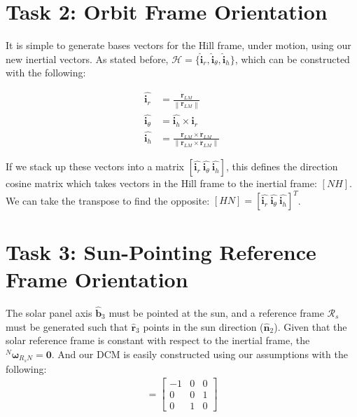 \documentclass[paper]{aiaaNew}
\newcommand{\norm}[1]{\left\lVert#1\right\rVert}
\begin{document}
\section*{Task 2: Orbit Frame Orientation}
It is simple to generate bases vectors for the Hill frame, under motion, using our new inertial vectors. As stated before, $\mathcal{H} = \{\bm{\hat{i}}_r, \bm{\hat{i}}_\theta, \bm{\hat{i}}_h \}$, which can be constructed with the following:

\begin{align}
  \hat{\bm{i}_r} &= \frac{\bm{r}_{LM}}{\norm{\bm{r}_{LM}}} \\
  \hat{\bm{i}_\theta} &= \hat{\bm{i}_h} \times \hat{\bm{i}_r} \\
  \hat{\bm{i}_h} &= \frac{\bm{r}_{LM} \times \dot{\bm{r}}_{LM}}{\norm{\bm{r}_{LM} \times \dot{\bm{r}}_{LM}}}
\end{align}

If we stack up these vectors into a matrix $[\hat{\bm{i}_r} \ \hat{\bm{i}_\theta} \ \hat{\bm{i}_h}]$, this defines the direction cosine matrix which takes vectors in the Hill frame to the inertial frame: $[NH]$. We can take the transpose to find the opposite: $[HN] = [\hat{\bm{i}_r} \ \hat{\bm{i}_\theta} \ \hat{\bm{i}_h}]^T$.









\section*{Task 3: Sun-Pointing Reference Frame Orientation}
The solar panel axis $\hat{\bm{b}}_3$ must be pointed at the sun, and a reference frame $\mathcal{R}_s$ must be generated such that $\hat{\bm{r}}_3$ points in the sun direction ($\hat{\bm{n}}_2$). Given that the solar reference frame is constant with respect to the inertial frame, the $^N\bm{\omega}_{R_s N} = \bm{0}$. And our DCM is easily constructed using our assumptions with the following: 
\begin{align}
  [R_sN] =  
  \begin{bmatrix}
  -1 & 0 & 0 \\
  0 & 0 & 1 \\
  0 & 1 & 0
  \end{bmatrix}
\end{align}
\end{document}
